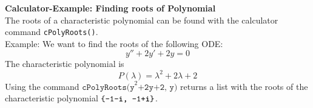 \textbf{Calculator-Example: Finding roots of Polynomial}\\
The roots of a characteristic polynomial can be found with the calculator command \texttt{cPolyRoots()}.\\
Example: We want to find the roots of the following ODE:
\begin{equation}
  y''+2y'+2y = 0
\end{equation}
The characteristic polynomial is
\begin{equation}
  P(\lambda) = \lambda^2 + 2\lambda + 2
\end{equation}
Using the command $\texttt{cPolyRoots(y}^2 \texttt{+2y+2, y)}$ returns a list with the roots of the characteristic polynomial
$\texttt{\{-1-\textbf{i}, -1+\textbf{i}\}} $.
